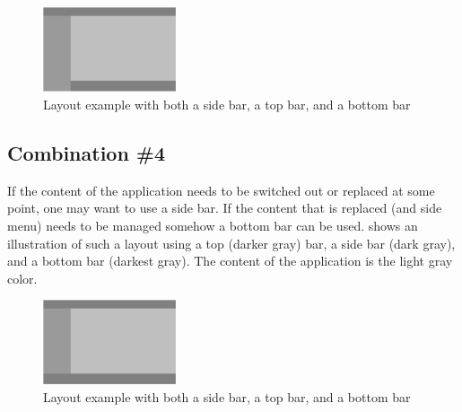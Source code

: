 \begin{figure}[!htbp]
    \centering
    \includegraphics[width=0.35\textwidth]{pictures/application_structure/bar_combinations_3}
    \caption{Layout example with both a side bar, a top bar, and a bottom bar}
    \label{fig:bar_combinations_3}
\end{figure}

\FloatBarrier

\subsection{Combination \#4}
If the content of the application needs to be switched out or replaced at some point, one may want to use a side bar. If the content that is replaced (and side menu) needs to be managed somehow a bottom bar can be used.  shows an illustration of such a layout using a top (darker gray) bar, a side bar (dark gray), and a bottom bar (darkest gray). The content of the application is the light gray color.


\begin{figure}[!htbp]
    \centering
    \includegraphics[width=0.35\textwidth]{pictures/application_structure/bar_combinations_4}
    \caption{Layout example with both a side bar, a top bar, and a bottom bar}
    \label{fig:bar_combinations_4}
\end{figure}



